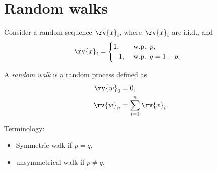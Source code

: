 \section{Random walks}
Consider a random sequence $\rv{x}_{i}$, where $\rv{x}_{i}$ are i.i.d., and
\begin{align}
    \rv{x}_{i} &= 
    \begin{cases}
        1, &\text{ w.p. } p,\\
        -1, &\text{ w.p. } q = 1-p.
    \end{cases}
\end{align}
\begin{definitionBox}
    A \emph{random walk} is a random process defined as
    \begin{align}
        \rv{w}_{0} &= 0,\\
        \rv{w}_{n} &= \sum_{i=1}^{n} \rv{x}_{i}.
    \end{align}
\end{definitionBox}
\begin{remarkBox}
    Terminology:
    \begin{itemize}
        \item Symmetric walk if $p=q$, 
        \item unsymmetrical walk if $p\neq q$.
    \end{itemize}
\end{remarkBox}